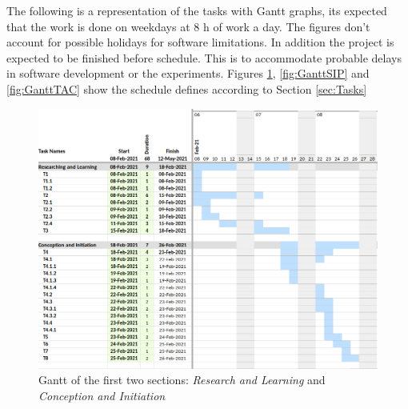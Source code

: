 The following is a representation of the tasks with Gantt graphs, its expected that the work is done on weekdays at 8 h of work a day. The figures don't account for possible holidays for software limitations. In addition the project is expected to be finished before schedule. This is to accommodate probable delays in software development or the experiments. Figures \ref{fig:GanttRLCI}, \ref{fig:GanttSIP} and \ref{fig:GanttTAC} show the schedule defines according to Section \ref{sec:Tasks}

\begin{figure}[h]
        \centering
        \centerline{\includegraphics[scale=0.45]{Figures/Gantt_RL_and_CI.png}}
        \caption{Gantt of the first two sections: \textit{Research and Learning} and \textit{Conception and Initiation}}
        \label{fig:GanttRLCI}
\end{figure}

